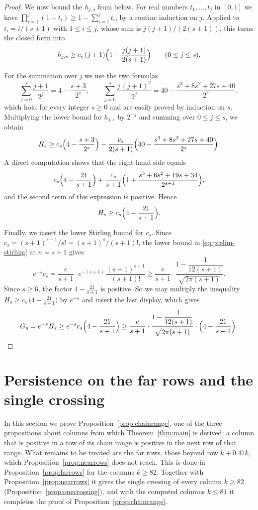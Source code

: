\documentclass{amsart}
\theoremstyle{definition}
\theoremstyle{remark}
\numberwithin{equation}{section}
\begin{document}
\begin{proof}
We now bound the $h_{j,s}$ from below. For real numbers $t_1,\dots,t_j$ in $[0,1]$ we have $\prod_{i=1}^{j}(1-t_i)\ge 1-\sum_{i=1}^{j}t_i$, by a routine induction on $j$. Applied to $t_i=i/(s+1)$ with $1\le i\le j$, whose sum is $j(j+1)/(2(s+1))$, this turns the closed form into
\[
h_{j,s}\ge c_s\,(j+1)\Bigl(1-\frac{j(j+1)}{2(s+1)}\Bigr)\qquad(0\le j\le s).
\]

For the summation over $j$ we use the two formulas
\[
\sum_{j=0}^{s}\frac{j+1}{2^j}=4-\frac{s+3}{2^s},\qquad\sum_{j=0}^{s}\frac{j\,(j+1)^2}{2^j}=40-\frac{s^3+8s^2+27s+40}{2^s} ,
\]
which hold for every integer $s\ge 0$ and are easily proved by induction on $s$. Multiplying the lower bound for $h_{j,s}$ by $2^{-j}$ and summing over $0\le j\le s$, we obtain
\[
H_s\ge c_s\Bigl(4-\frac{s+3}{2^s}\Bigr)-\frac{c_s}{2(s+1)}\Bigl(40-\frac{s^3+8s^2+27s+40}{2^s}\Bigr) .
\]
A direct computation shows that the right-hand side equals
\[
c_s\Bigl(4-\frac{21}{s+1}\Bigr)+\frac{c_s}{s+1}\Bigl(1+\frac{s^3+6s^2+19s+34}{2^{s+1}}\Bigr) ,
\]
and the second term of this expression is positive. Hence
\[
H_s\ge c_s\Bigl(4-\frac{21}{s+1}\Bigr) .
\]

Finally, we insert the lower Stirling bound for $c_s$. Since $c_s=(s+1)^{s-1}/s!=(s+1)^{s}/(s+1)!$, the lower bound in \eqref{eq:prelim-stirling} at $n=s+1$ gives
\[
e^{-s}c_s=\frac{e}{s+1}\cdot e^{-(s+1)}\,\frac{(s+1)^{s+1}}{(s+1)!}\ge\frac{e}{s+1}\cdot\frac{1-\dfrac{1}{12(s+1)}}{\sqrt{2\pi(s+1)}} .
\]
Since $s\ge 6$, the factor $4-\frac{21}{s+1}$ is positive. So we may multiply the inequality $H_s\ge c_s\,\bigl(4-\frac{21}{s+1}\bigr)$ by $e^{-s}$ and insert the last display, which gives
\[
G_s=e^{-s}H_s\ge e^{-s}c_s\Bigl(4-\frac{21}{s+1}\Bigr)\ge\frac{e}{s+1}\cdot\frac{1-\dfrac{1}{12(s+1)}}{\sqrt{2\pi(s+1)}}\cdot\Bigl(4-\frac{21}{s+1}\Bigr) .\qedhere
\]
\end{proof}

\section{Persistence on the far rows and the single crossing}\label{sec:far}
In this section we prove Proposition~\ref{prop:chainrange}, one of the three propositions about columns from which Theorem~\ref{thm:main} is derived: a column that is positive in a row of its chain range is positive in the next row of that range. What remains to be treated are the far rows, those beyond row $k+0.47k$, which Proposition~\ref{prop:nearrows} does not reach. This is done in Proposition~\ref{prop:farrows} for the columns $k\ge 82$. Together with Proposition~\ref{prop:nearrows} it gives the single crossing of every column $k\ge 82$ (Proposition~\ref{prop:onecrossing}), and with the computed columns $k\le 81$ it completes the proof of Proposition~\ref{prop:chainrange}.
\end{document}
